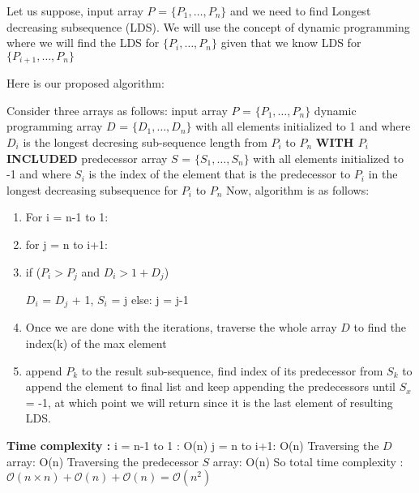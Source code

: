 \documentclass[11pt]{article}
\renewcommand{\O}{\mathcal{O}}
\begin{document}
Let us suppose, input array $P$ = $\{P_1, \dots, P_n\}$ and we need to find Longest decreasing subsequence (LDS). 
We will use the concept of dynamic programming where we will find the LDS for $\{P_i, \dots, P_n\}$ 
given that we know LDS for $\{P_{i+1}, \dots, P_n\}$ \newline

Here is our proposed algorithm: \newline

 Consider three arrays as follows: \newline
input array $P$ = $\{P_1, \dots, P_n\}$ \newline
dynamic programming array $D$ = $\{D_1, \dots, D_n\}$ with all elements initialized to 1 and
where $D_i$ is the longest decresing sub-sequence length from $P_i$ to $P_n$ {\bf WITH $P_i$ INCLUDED}
\newline
predecessor array $S$ = $\{S_1, \dots, S_n\}$  with all elements initialized to -1 and
where $S_i$ is the index of the element that is the predecessor to $P_i$ in the longest
decreasing subsequence for $P_i$ to $P_n$ \newline
Now, algorithm is as follows:
\begin{enumerate}
  \item For i = n-1 to 1:
 
  \item for j = n to i+1:

  \item if ($P_i > P_j$ and $D_i > 1 + D_j$)

$D_i$ = $D_j$ + 1, $S_i$ = j \newline
else: j = j-1
\item Once we are done with the iterations, traverse the whole array $D$ to find the index(k) of the max element \newline
\item append $P_k$ to the result sub-sequence, find index of its predecessor from $S_k$ to append the element to final list\newline
and keep appending the predecessors until $S_x$ = -1, at which point we will return since it is the last element of resulting LDS.
 \end{enumerate}

{\bf Time complexity :} \newline
i = n-1 to 1 : O(n) \newline
j = n to i+1: O(n) \newline
Traversing the $D$ array: O(n) \newline
Traversing the predecessor $S$ array: O(n) \newline
So total time complexity : $\O(n \times n) + \O(n) + \O(n) = \O(n^2)$ \newline
\end{document}
